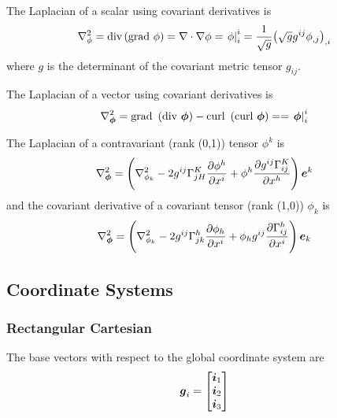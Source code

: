 The Laplacian of a scalar using covariant derivatives is
\begin{equation}
  \laplacian{\phi}=\text{div}\pbrac{\text{grad }\phi}=\divergence{}{\gradient{}{\phi}}=\mixedderiv{\phi}{i}{i}=\frac{1}{\sqrt{g}}\partialderiv{\pbrac{\sqrt{g}g^{ij}\partialderiv{\phi}{j}}}{i}
\end{equation}
where $g$ is the determinant of the covariant metric tensor $g_{ij}$.

The Laplacian of a vector using covariant derivatives is
\begin{equation}
  \laplacian{\vectr{\phi}}=\text{grad }\pbrac{\text{div }\vectr{\phi}}-\text{curl } \pbrac{\text{curl }\vectr{\phi}}==\mixedderiv{\vectr{\phi}}{i}{i}
\end{equation}

The Laplacian of a contravariant (rank (0,1)) tensor $\phi^{k}$ is
\begin{equation}
  \laplacian{\vectr{\phi}}=\pbrac{\laplacian{\phi_{k}}-2g^{ij}\christoffel{K}{j}{H}\delby{\phi^{h}}{x^{i}}+\phi^{h}\delby{g^{ij}\christoffel{K}{i}{j}}{x^{h}}}\vectr{e}^{k}
\end{equation}
and the covariant derivative of a covariant tensor  (rank (1,0)) $\phi_{k}$ is
\begin{equation}
  \laplacian{\vectr{\phi}}=\pbrac{\laplacian{\phi_{k}}-2g^{ij}\christoffel{h}{j}{k}\delby{\phi_{h}}{x^{i}}+\phi_{h}g^{ij}\delby{\christoffel{h}{i}{j}}{x^{i}}}\vectr{e}_{k}
\end{equation}

\subsection{Coordinate Systems}
\label{sec:coordinate systems}

\subsubsection{Rectangular Cartesian}

The base vectors with respect to the global coordinate system are
\begin{equation}
  \boldsymbol{g}_{i}=\begin{bmatrix} 
    \boldsymbol{i}_{1} \\ 
    \boldsymbol{i}_{2} \\
    \boldsymbol{i}_{3} 
  \end{bmatrix}
\end{equation}

